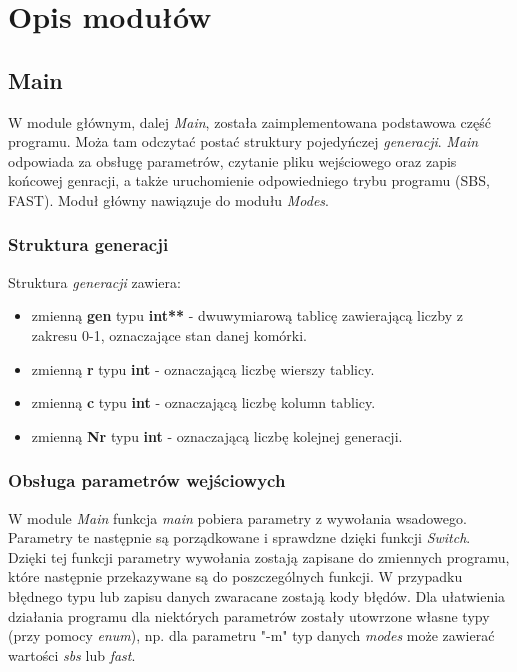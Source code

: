 \documentclass[a4paper]{article}
\begin{document}
\section{Opis modu\l{}\'ow}

\subsection{Main}

\quad W module g\l{}\'ownym, dalej \textit{Main}, zosta\l{}a zaimplementowana podstawowa cz\k{e}\'s\'c programu. 
Mo\.za tam odczyta\'c posta\'c struktury pojedy\'nczej \textit{generacji}. 
\textit{Main} odpowiada za obs\l{}ug\k{e} parametr\'ow, czytanie pliku wej\'sciowego oraz zapis ko\'ncowej genracji, a tak\.ze uruchomienie odpowiedniego trybu programu (SBS, FAST). 
Modu\l{} g\l{}\'owny nawi\k{a}zuje do modu\l{}u \textit{Modes}.  

\subsubsection{Struktura generacji}

\quad Struktura \textit{generacji} zawiera: 
\begin{itemize}

	\item zmienn\k{a} \textbf{gen} typu \textbf{int**} - dwuwymiarow\k{a} tablic\k{e} zawieraj\k{a}c\k{a} liczby z zakresu 0-1, oznaczaj\k{a}ce stan danej kom\'orki.
	\item zmienn\k{a} \textbf{r} typu \textbf{int} - oznaczaj\k{a}c\k{a} liczb\k{e} wierszy tablicy.
	\item zmienn\k{a} \textbf{c} typu \textbf{int} - oznaczaj\k{a}c\k{a} liczb\k{e} kolumn tablicy.
	\item zmienn\k{a} \textbf{Nr} typu \textbf{int} - oznaczaj\k{a}c\k{a} liczb\k{e} kolejnej generacji.

\end{itemize}

\subsubsection{Obs\l{}uga parametr\'ow wej\'sciowych}

\quad W module \textit{Main} funkcja \textit{main} pobiera parametry z wywo\l{}ania wsadowego. 
Parametry te nast\k{e}pnie s\k{a} porz\k{a}dkowane i sprawdzne dzi\k{e}ki funkcji \textit{Switch}. 
Dzi\k{e}ki tej funkcji parametry wywo\l{}ania zostaj\k{a} zapisane do zmiennych programu, kt\'ore nast\k{e}pnie przekazywane s\k{a} do poszczeg\'olnych funkcji. 
W przypadku b\l{}\k{e}dnego typu lub zapisu danych zwaracane zostaj\k{a} kody b\l{}\k{e}d\'ow.
Dla u\l{}atwienia dzia\l{}ania programu dla niekt\'orych parametr\'ow zosta\l{}y utowrzone w\l{}asne typy (przy pomocy \textit{enum}), np. dla parametru "-m" typ danych \textit{modes} mo\.ze zawiera\'c warto\'sci \textit{sbs} lub \textit{fast}.
\end{document}
